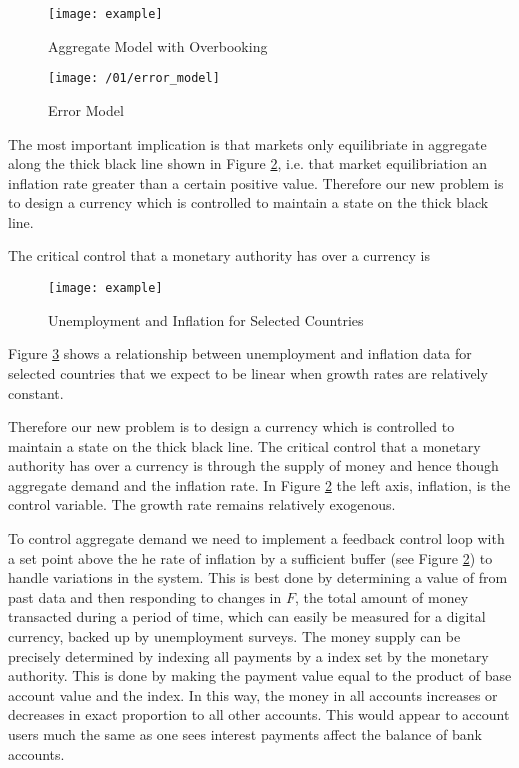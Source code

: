 \begin{figure}
\centering
\texttt{[image: example]}
\caption{Aggregate Model with Overbooking}
\label{fig:aggregate_overbooking}
\end{figure}

\begin{figure}
\centering
\texttt{[image: /01/error\_model]}
\caption{Error Model}
\label{fig:error_model}
\end{figure}

The most important implication is that markets only equilibriate in aggregate along the thick black
line shown in Figure \ref{fig:error_model}, i.e. that market equilibriation an inflation rate
greater than a certain positive value. Therefore our new problem is to design a currency which is
controlled to maintain a state on the thick black line.

The critical control that a monetary authority has over a currency is

\begin{figure}
\centering
\texttt{[image: example]}
\caption{Unemployment and Inflation for Selected Countries}
\label{fig:ui_multi}
\end{figure}

Figure \ref{fig:ui_multi} shows a relationship between unemployment and inflation data for selected
countries that we expect to be linear when growth rates are relatively constant.

Therefore our new problem is to design a currency which is controlled to maintain a
state on the thick black line. The critical control that a monetary authority has over a currency is
through the supply of money and hence though aggregate demand and the inflation rate. In Figure
\ref{fig:error_model} the left axis, inflation, is the control variable. The growth
rate remains relatively exogenous.

To control aggregate demand we need to implement a feedback control loop with a set point above the
he rate of inflation by a sufficient buffer (see Figure \ref{fig:error_model}) to handle variations
in the system. This is best done by determining a value of from past data and then responding to
changes in $F$, the
total amount of money transacted during a period of time, which can easily be measured for a digital
currency, backed up by unemployment surveys. The money supply can be precisely determined by
indexing all payments by a index set by the monetary authority. This is done by making the payment
value equal to the product of base account value and the index. In this way, the money in all
accounts increases or decreases in exact proportion to all other accounts. This would appear to
account users much the same as one sees interest payments affect the balance of bank accounts.

